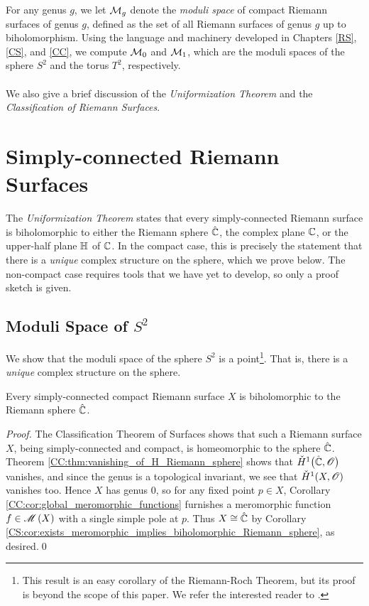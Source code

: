 \documentclass[../Moduli_Spaces_of_Riemann_Surfaces.tex]{subfiles}
\begin{document}
    For any genus $g$, we let $\mathcal{M}_g$ denote the \textit{moduli space} of compact Riemann surfaces of genus $g$, defined as the set of all Riemann surfaces of genus $g$ up to biholomorphism. Using the language and machinery developed in Chapters \ref{RS}, \ref{CS}, and \ref{CC}, we compute $\mathcal{M}_0$ and $\mathcal{M}_1$, which are the moduli spaces of the sphere $S^2$ and the torus $T^2$, respectively.\\\ \\
    We also give a brief discussion of the \textit{Uniformization Theorem} and the \textit{Classification of Riemann Surfaces}.
    \section{Simply-connected Riemann Surfaces}
    The \textit{Uniformization Theorem} states that every simply-connected Riemann surface is biholomorphic to either the Riemann sphere $\hat{\mathbb{C}}$, the complex plane $\mathbb{C}$, or the upper-half plane $\mathbb{H}$ of $\mathbb{C}$. In the compact case, this is precisely the statement that there is a \textit{unique} complex structure on the sphere, which we prove below. The non-compact case requires tools that we have yet to develop, so only a proof sketch is given.
    \subsection{Moduli Space of $S^2$}\label{MS:sec:moduli_space_of_sphere}
    We show that the moduli space of the sphere $S^2$ is a point\footnote{This result is an easy corollary of the Riemann-Roch Theorem, but its proof is beyond the scope of this paper. We refer the interested reader to \cite[][Section 16]{forster}.}. That is, there is a \textit{unique} complex structure on the sphere.
    \begin{theorem}\label{MS:thm:simply-connect_compact_biholomorphic_Riemann_sphere}
        Every simply-connected compact Riemann surface $X$ is biholomorphic to the Riemann sphere $\hat{\mathbb{C}}$.
    \end{theorem}
    \begin{proof}
        The Classification Theorem of Surfaces shows that such a Riemann surface $X$, being simply-connected and compact, is homeomorphic to the sphere $\hat{\mathbb{C}}$. Theorem \ref{CC:thm:vanishing_of_H_Riemann_sphere} shows that $\check{H}^1\big(\hat{\mathbb{C}},\mathscr{O}\big)$ vanishes, and since the genus is a topological invariant, we see that $\check{H}^1\!\left(X,\mathscr{O}\right)$ vanishes too. Hence $X$ has genus $0$, so for any fixed point $p\in X$, Corollary \ref{CC:cor:global_meromorphic_functions} furnishes a meromorphic function $f\in\mathscr{M}\left(X\right)$ with a single simple pole at $p$. Thus $X\cong\hat{\mathbb{C}}$ by Corollary \ref{CS:cor:exists_meromorphic_implies_biholomorphic_Riemann_sphere}, as desired.\qed
    \end{proof}
\end{document}
